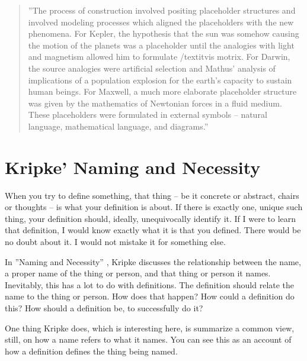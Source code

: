 \documentclass[graybox,envcountchap,sectrefs]{svmono}
\begin{document}
\begin{quote}
''The process of construction involved positing placeholder structures and involved modeling processes which aligned the placeholders with the new phenomena. For Kepler, the hypothesis that the sun was somehow causing the motion of the planets was a placeholder until the analogies with light and magnetism allowed him to formulate /textit{vis motrix}. For Darwin, the source analogies were artificial selection and Mathus' analysis of implications of a population explosion for the earth's capacity to sustain human beings. For Maxwell, a much more elaborate placeholder structure was given by the mathematics of Newtonian forces in a fluid medium. These placeholders were formulated in external symbols -- natural language, mathematical language, and diagrams.'' \cite{carey2011precis}
\end{quote}



\section{Kripke' Naming and Necessity}
\label{c4:s5}
When you try to define something, that thing -- be it concrete or abstract, chairs or thoughts -- is what your definition is about. If there is exactly one, unique such thing, your definition should, ideally, unequivocally identify it. If I were to learn that definition, I would know exactly what it is that you defined. There would be no doubt about it. I would not mistake it for something else.

In ''Naming and Necessity'' \cite{kripke1972naming}, Kripke discusses the relationship between the name, a proper name of the thing or person, and that thing or person it names. Inevitably, this has a lot to do with definitions. The definition should relate the name to the thing or person. How does that happen? How could a definition do this? How should a definition be, to successfully do it?

One thing Kripke does, which is interesting here, is summarize a common view, still, on how a name refers to what it names. You can see this as an account of how a definition defines the thing being named.
\end{document}
